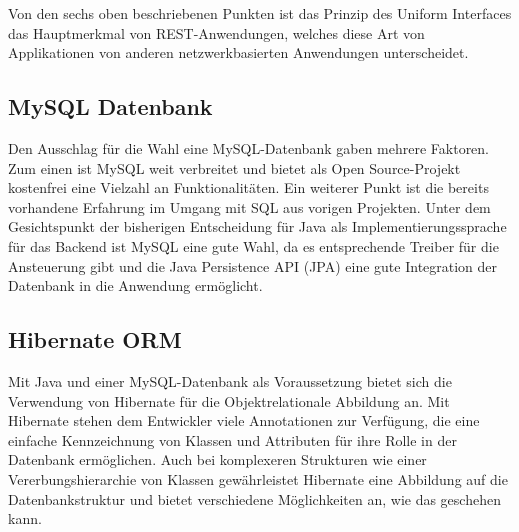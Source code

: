 Von den sechs oben beschriebenen Punkten ist das Prinzip des Uniform Interfaces das Hauptmerkmal von REST-Anwendungen, welches diese Art von Applikationen von anderen netzwerkbasierten Anwendungen unterscheidet. %

\subsection{MySQL Datenbank}
Den Ausschlag für die Wahl eine MySQL-Datenbank gaben mehrere Faktoren. Zum einen ist MySQL weit verbreitet und bietet als Open Source-Projekt kostenfrei eine Vielzahl an Funktionalitäten.
Ein weiterer Punkt ist die bereits vorhandene Erfahrung im Umgang mit SQL aus vorigen Projekten.
Unter dem Gesichtspunkt der bisherigen Entscheidung für Java als Implementierungssprache für das Backend ist MySQL eine gute Wahl, da es entsprechende Treiber für die Ansteuerung gibt und die Java Persistence API (\acs{JPA}) eine gute Integration der Datenbank in die Anwendung ermöglicht.

\subsection{Hibernate ORM}
Mit Java und einer MySQL-Datenbank als Voraussetzung bietet sich die Verwendung von Hibernate für die Objektrelationale Abbildung an.
Mit Hibernate stehen dem Entwickler viele Annotationen zur Verfügung, die eine einfache Kennzeichnung von Klassen und Attributen für ihre Rolle in der Datenbank ermöglichen.
Auch bei komplexeren Strukturen wie einer Vererbungshierarchie von Klassen gewährleistet Hibernate eine Abbildung auf die Datenbankstruktur und bietet verschiedene Möglichkeiten an, wie das geschehen kann.
